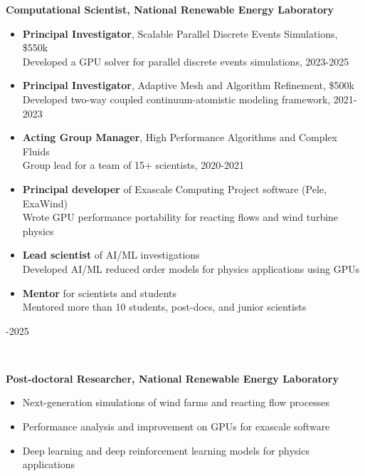 \documentclass[11pt,letterpaper]{article}
\begin{document}
\begin{minipage}[t]{0.82\textwidth}%
  \textbf{Computational Scientist, National Renewable Energy Laboratory}\vspace*{0.5ex}%
  \begin{itemize}[itemsep=0.5ex]
  \item[-] \textbf{Principal Investigator}, Scalable Parallel Discrete Events Simulations, \$550k\\%
    Developed a GPU solver for parallel discrete events simulations, 2023-2025%
  \item[-] \textbf{Principal Investigator}, Adaptive Mesh and Algorithm Refinement, \$500k\\%
    Developed two-way coupled continuum-atomistic modeling framework, 2021-2023%
  \item[-] \textbf{Acting Group Manager}, High Performance Algorithms and Complex Fluids\\%
    Group lead for a team of 15+ scientists, 2020-2021%
  \item[-] \textbf{Principal developer} of Exascale Computing Project software (Pele, ExaWind)\\%
    Wrote GPU performance portability for reacting flows and wind turbine physics
  \item[-] \textbf{Lead scientist} of AI/ML investigations\\%
    Developed AI/ML reduced order models for physics applications using GPUs
  \item[-] \textbf{Mentor} for scientists and students\\%
    Mentored more than 10 students, post-docs, and junior scientists%
  \end{itemize}
\end{minipage}\hfill%
\begin{minipage}[t]{0.15\textwidth}-2025%
\end{minipage}\\[3ex]%
\begin{minipage}[t]{0.82\textwidth}%
  \textbf{Post-doctoral Researcher, National Renewable Energy Laboratory}\vspace*{0.5ex}%
  \begin{itemize}[itemsep=0.5ex]
  \item[-] Next-generation simulations of wind farms and reacting flow processes%
  \item[-] Performance analysis and improvement on GPUs for exascale software%
  \item[-] Deep learning and deep reinforcement learning models for physics applications%
  \end{itemize}
\end{minipage}\hfill%
\end{document}
